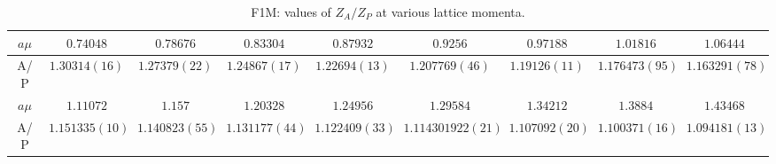 \begin{table}[h!]
\begin{center}
\caption{F1M: values of $Z_A/Z_P$ at various lattice momenta.}
\begin{tabular}{c|c c c c c c c c}
\hline
\hline
$a\mu$ & $0.74048$ & $0.78676$ & $0.83304$ & $0.87932$ & $0.9256$ & $0.97188$ & $1.01816$ & $1.06444$ \\
\hline
A/P & $1.30314(16)$ & $1.27379(22)$ & $1.24867(17)$ & $1.22694(13)$ & $1.207769(46)$ & $1.19126(11)$ & $1.176473(95)$ & $1.163291(78)$ \\
\hline
$a\mu$ & $1.11072$ & $1.157$ & $1.20328$ & $1.24956$ & $1.29584$ & $1.34212$ & $1.3884$ & $1.43468$ \\
\hline
A/P & $1.151335(10)$ & $1.140823(55)$ & $1.131177(44)$ & $1.122409(33)$ & $1.114301922(21)$ & $1.107092(20)$ & $1.100371(16)$ & $1.094181(13)$ \\
\hline
\hline
\end{tabular}
\end{center}
\end{table}